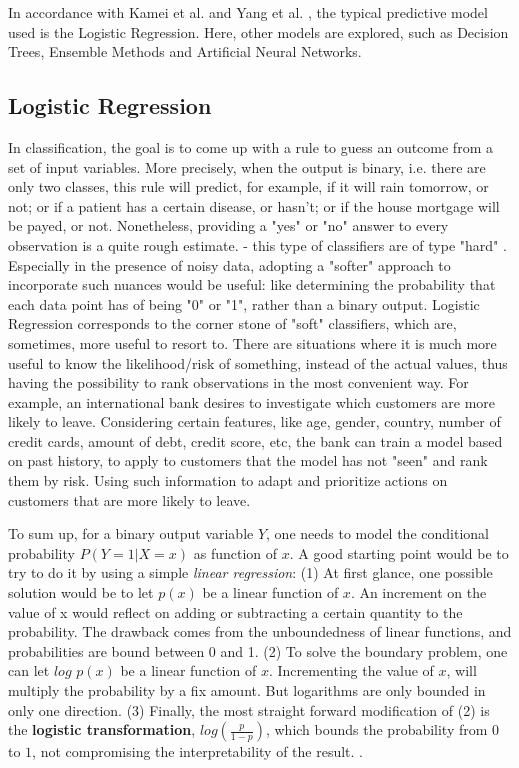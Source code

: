 In accordance with Kamei et al. \cite{kameiJIT} and Yang et al. \cite{yangJIT}, the typical predictive model used is the Logistic Regression. Here, other models are explored, such as Decision Trees, Ensemble Methods and Artificial Neural Networks.

\subsection{Logistic Regression}

In classification, the goal is to come up with a rule to guess an outcome from a set of input variables. More precisely, when the output is binary, i.e. there are only two classes, this rule will predict, for example, if it will rain tomorrow, or not; or if a patient has a certain disease, or hasn't; or if the house mortgage will be payed, or not. Nonetheless, providing a "yes" or "no" answer to every observation is a quite rough estimate. - this type of classifiers are of type "hard" \cite{ml_phys}. Especially in the presence of noisy data, adopting a "softer" approach to incorporate such nuances would be useful: like determining the probability that each data point has of being "0" or "1", rather than a binary output.\cite{shalizi} Logistic Regression corresponds to the corner stone of "soft" classifiers, which are, sometimes, more useful to resort to. There are situations where it is much more useful to know the likelihood/risk of something, instead of the actual values, thus having the possibility to rank observations in the most convenient way. \cite{ml_phys}
For example, an international bank desires to investigate which customers are more likely to leave. Considering certain features, like age, gender, country, number of credit cards, amount of debt, credit score, etc, the bank can train a model based on past history, to apply to customers that the model has not "seen" and rank them by risk. Using such information to adapt and prioritize actions on customers that are more likely to leave. 

To sum up, for a binary output variable $Y$, one needs to model the conditional probability $P(Y=1|X=x)$ as function of $x$. A good starting point would be to try to do it by using a simple \textit{linear regression}: (1) At first glance, one possible solution would be to let $p(x)$ be a linear function of $x$. An increment on the value of x would reflect on adding or subtracting a certain quantity to the probability. The drawback comes from the unboundedness of linear functions, and probabilities are bound between 0 and 1. (2) To solve the boundary problem, one can let $log$ $p(x)$ be a linear function of $x$. Incrementing the value of $x$, will multiply the probability by a fix amount. But logarithms are only bounded in only one direction. (3) Finally, the most straight forward modification of (2) is the \textbf{logistic transformation}, $log(\frac{p}{1-p})$, which bounds the probability from $0$ to $1$, not compromising the interpretability of the result. \cite{shalizi}.


